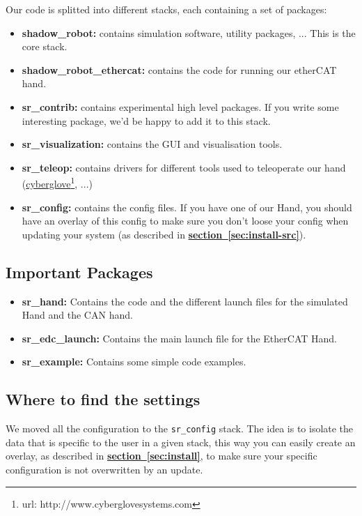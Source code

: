 \documentclass[12pt]{article}
\newcommand{\link}[1]{\hyperref[sec:#1]{\textbf{section~\ref*{sec:#1}}}}
\newcommand{\betterhref}[2]{\href{#1}{#2}\footnote{url: #1}}
\begin{document}
\par Our code is splitted into different stacks, each containing a set of packages:
\begin{itemize}
\item \textbf{shadow\_robot:} contains simulation software, utility packages, ... This is the core stack.
\item \textbf{shadow\_robot\_ethercat:} contains the code for running our etherCAT hand.
\item \textbf{sr\_contrib:} contains experimental high level packages. If you write some interesting package, we'd be happy to add it to this stack.
\item \textbf{sr\_visualization:} contains the GUI and visualisation tools.
\item \textbf{sr\_teleop:} contains drivers for different tools used to teleoperate our hand (\betterhref{http://www.cyberglovesystems.com}{cyberglove}, ...)
\item \textbf{sr\_config:} contains the config files. If you have one of our Hand, you should have an overlay of this config to make sure you don't loose your config when updating your system (as described in \link{install-src}).
\end{itemize}

\subsection{Important Packages}
\label{sec:important-packages}
\begin{itemize}
\item \textbf{sr\_hand:} Contains the code and the different launch files for the simulated Hand and the CAN hand.
\item \textbf{sr\_edc\_launch:} Contains the main launch file for the EtherCAT Hand.
\item \textbf{sr\_example:} Contains some simple code examples.
\end{itemize}


\subsection{Where to find the settings}
\label{sec:where-find-settings}
\par We moved all the configuration to the \texttt{sr\_config} stack. The idea is to isolate the data that is specific to the user in a given stack, this way you can easily create an overlay, as described in \link{install}, to make sure your specific configuration is not overwritten by an update.
\end{document}
